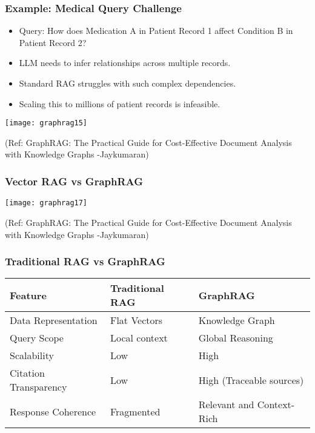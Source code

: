 \begin{frame}[fragile]\frametitle{Example: Medical Query Challenge}
    \begin{itemize}
        \item Query: How does Medication A in Patient Record 1 affect Condition B in Patient Record 2?
        \item LLM needs to infer relationships across multiple records.
        \item Standard RAG struggles with such complex dependencies.
        \item Scaling this to millions of patient records is infeasible.
    \end{itemize}
	
	\begin{center}
	\texttt{[image: graphrag15]}
	
	{\tiny (Ref: GraphRAG: The Practical Guide for Cost-Effective Document Analysis with Knowledge Graphs -Jaykumaran)}
	\end{center}	
\end{frame}

\begin{frame}[fragile]\frametitle{Vector RAG vs GraphRAG}

	
	\begin{center}
	\texttt{[image: graphrag17]}
	
	{\tiny (Ref: GraphRAG: The Practical Guide for Cost-Effective Document Analysis with Knowledge Graphs -Jaykumaran)}
	\end{center}	
\end{frame}

\begin{frame}[fragile]\frametitle{Traditional RAG vs GraphRAG}
    \begin{table}[]
        \centering
        \begin{tabular}{|l|l|l|}
            \hline
            \textbf{Feature} & \textbf{Traditional RAG} & \textbf{GraphRAG} \\
            \hline
            Data Representation & Flat Vectors & Knowledge Graph \\
            \hline
            Query Scope & Local context & Global Reasoning \\
            \hline
            Scalability & Low & High \\
            \hline
            Citation Transparency & Low & High (Traceable sources) \\
            \hline
            Response Coherence & Fragmented & Relevant and Context-Rich \\
            \hline
        \end{tabular}
    \end{table}
\end{frame}

